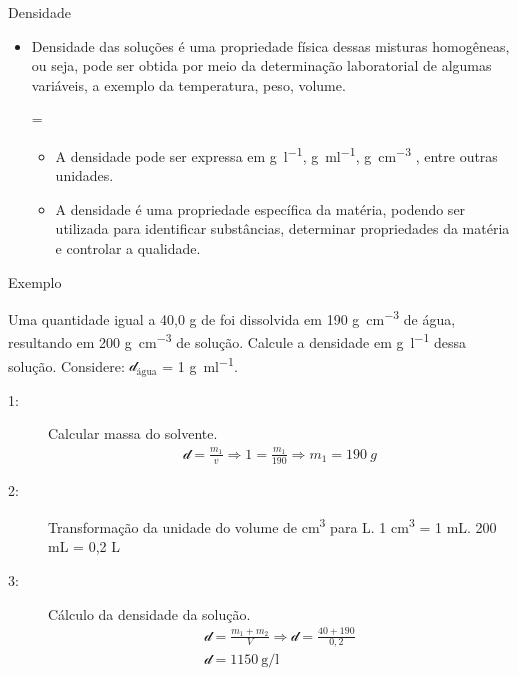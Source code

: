 \documentclass[presentation,professionalfonts,aspectratio=169]{beamer}
\begin{document}
\begin{frame}[label={sec:orga3fa023}]{Densidade}
\begin{itemize}
\item Densidade das soluções é uma propriedade física dessas misturas homogêneas, ou seja, pode ser obtida por meio da determinação laboratorial de algumas variáveis, a exemplo da temperatura, peso, volume.

\begin{tcolorbox}
=
\end{tcolorbox}

\begin{itemize}
\item A densidade pode ser expressa em \unit{\gram\per\litre}, \unit{\gram\per\ml}, \unit{\gram\per\cubic\centi\metre} , entre outras unidades.
\end{itemize}
\begin{itemize}
\item A densidade é uma propriedade específica da matéria, podendo ser utilizada para identificar substâncias, determinar propriedades da matéria e controlar a qualidade.
\end{itemize}
\end{itemize}
\end{frame}

\begin{frame}[label={sec:org0933e06}]{Exemplo}
\begin{question}
Uma quantidade igual a 40,0 g de  foi dissolvida em 190 \unit{\gram\per\cubic\centi\metre} de água, resultando em 200 \unit{\gram\per\cubic\centi\metre} de solução. Calcule a densidade em \unit{\gram\per\litre} dessa solução. Considere: \(\mathcal{d}_{\text{água}}\) = 1 \unit{\gram\per\ml}.
\end{question}
\end{frame}



\begin{frame}[label={sec:org8d5f752}]{}
\begin{answer}[print=true]
\begin{description}
\item[{1:}] Calcular massa do solvente.
\begin{align*}
\mathcal{d}=\frac{m_1}{v} \Rightarrow 1 = \frac{m_1}{190} \Rightarrow m_1= 190\ \unit{g} 
\end{align*}

\item[{2:}] Transformação da unidade do volume de cm\textsuperscript{3} para L. 1 cm\textsuperscript{3} = 1 mL. 200 mL = 0,2 L
\item[{3:}] Cálculo da densidade da solução.
\begin{align*}
\mathcal{d} = \frac{m_1 + m_2}{V} \Rightarrow \mathcal{d} = \frac{40 + 190}{0,2}\\
\mathcal{d} = 1150 ~\unit{\gram\per\litre}
\end{align*}
\end{description}
\end{answer}
\end{frame}
\end{document}
